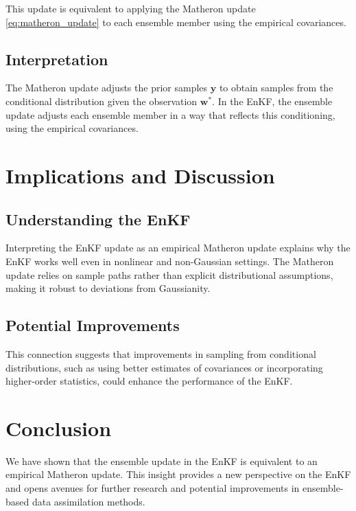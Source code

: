 \documentclass{article}
\theoremstyle{plain}
\begin{document}
This update is equivalent to applying the Matheron update \eqref{eq:matheron_update} to each ensemble member using the empirical covariances.

\subsection{Interpretation}

The Matheron update adjusts the prior samples $\mathbf{y}$ to obtain samples from the conditional distribution given the observation $\mathbf{w}^\ast$. In the EnKF, the ensemble update adjusts each ensemble member in a way that reflects this conditioning, using the empirical covariances.

\section{Implications and Discussion}

\subsection{Understanding the EnKF}

Interpreting the EnKF update as an empirical Matheron update explains why the EnKF works well even in nonlinear and non-Gaussian settings. The Matheron update relies on sample paths rather than explicit distributional assumptions, making it robust to deviations from Gaussianity.

\subsection{Potential Improvements}

This connection suggests that improvements in sampling from conditional distributions, such as using better estimates of covariances or incorporating higher-order statistics, could enhance the performance of the EnKF.

\section{Conclusion}

We have shown that the ensemble update in the EnKF is equivalent to an empirical Matheron update. This insight provides a new perspective on the EnKF and opens avenues for further research and potential improvements in ensemble-based data assimilation methods.



\end{document}
